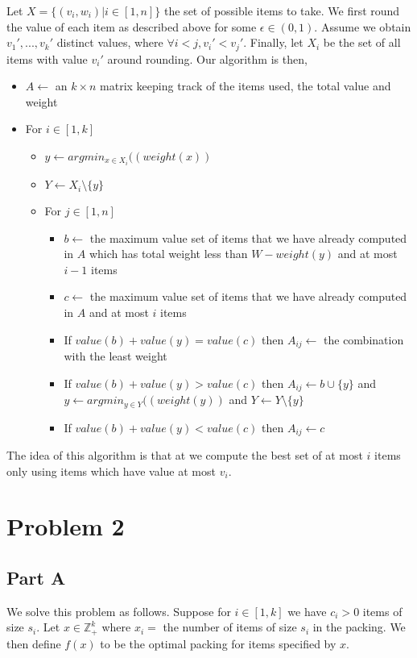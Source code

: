 \documentclass[a4paper]{article}
\begin{document}
Let $X = \{(v_i, w_i) | i\in [1,n]\}$ the set of possible items to take. We first 
round the value of each item as described above for some $\epsilon \in (0,1)$. 
Assume we obtain $v_1', ..., v_k'$ distinct values, where $\forall i<j, v_i' < v_j'$. Finally, 
let $X_i$ be the set of all items with value $v_i'$ around rounding. Our algorithm is then,


\begin{itemize}
	\item $A \gets $ an $k\times n$ matrix keeping track of the items used, the total value and weight 
	\item For $i \in [1,k]$
	\begin{itemize}
		\item $y \gets argmin_{x\in X_i}((weight(x))$ 
		\item $Y \gets X_i \setminus \{y\}$
		\item For $j \in [1,n]$
		\begin{itemize}
			\item $b \gets $ the maximum value set of items that we have already computed in $A$ which has total weight less than $W - weight(y)$ and at most $i-1$ items
			\item $c \gets $ the maximum value set of items that we have already computed in $A$ and at most $i$ items
			\item If $value(b) + value(y) = value(c)$ then $A_{ij} \gets $ the combination with the least weight
			\item If $value(b) + value(y) > value(c)$ then $A_{ij} \gets b \cup \{y\}$ and $y \gets argmin_{y\in Y}((weight(y))$ and $Y \gets Y \setminus \{y\}$
			\item If $value(b) + value(y) < value(c)$ then $A_{ij} \gets c$
		\end{itemize}
	\end{itemize}
\end{itemize}


The idea of this algorithm is that at we compute the best set of at most $i$ items only using 
items which have value at most $v_i$. 



\section{Problem 2}
\subsection{Part A}
We solve this problem as follows. Suppose for $i\in [1,k]$ we have $c_i > 0$ items of size $s_i$. 
Let $x \in \mathds{Z}_+^k$ where $x_i = $ the number of items of size $s_i$ in the packing.
We then define $f(x)$ to be the optimal packing for items specified by $x$. 
\end{document}
